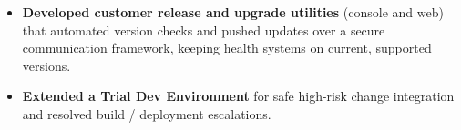 \documentclass{resume-v2}
\begin{document}
\begin{itemize}
  \item \textbf{Developed customer release and upgrade utilities} (console and web) that automated version checks and pushed updates over a secure communication framework, keeping health systems on current, supported versions.
  \item \textbf{Extended a Trial Dev Environment} for safe high-risk change integration and resolved build / deployment escalations.
\end{itemize}
\end{document}
